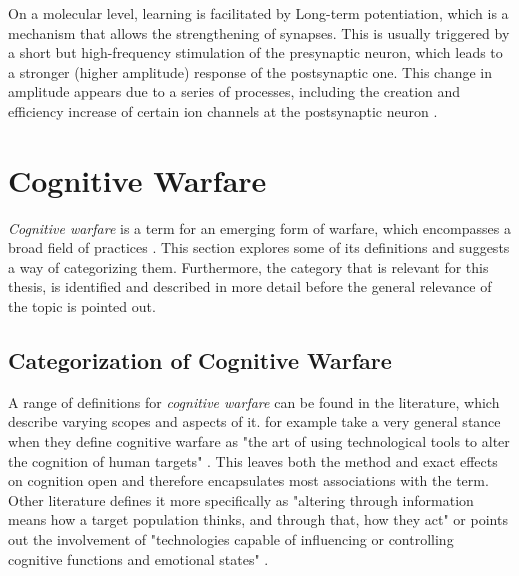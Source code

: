 
    On a molecular level, learning is facilitated by Long-term potentiation, which is a mechanism that allows the strengthening of synapses. This is usually triggered by a short but high-frequency stimulation of the presynaptic neuron, which leads to a stronger (higher amplitude) response of the postsynaptic one. This change in amplitude appears due to a series of processes, including the creation and efficiency increase of certain ion channels at the postsynaptic neuron \cite{thebrain-memory-molecular-a}.

    
\section{Cognitive Warfare}

    \textit{Cognitive warfare} is a term for an emerging form of warfare, which encompasses a broad field of practices \cite{Backes.2019} \cite{Claverie.2022} \cite{EADS.2023} \cite{MAKSYMENKO.2023} \cite{McCreight.2024} \cite{Miller.2023}. This section explores some of its definitions and suggests a way of categorizing them. Furthermore, the category that is relevant for this thesis, is identified and described in more detail before the general relevance of the topic is pointed out.


    \subsection{Categorization of Cognitive Warfare}

        A range of definitions for \textit{cognitive warfare} can be found in the literature, which describe varying scopes and aspects of it. \textcite{Claverie.2022} for example take a very general stance when they define cognitive warfare as "the art of using technological tools to alter the cognition of human targets" \cite{Claverie.2022}. This leaves both the method and exact effects on cognition open and therefore encapsulates most associations with the term.
        Other literature defines it more specifically as "altering through information means how a target population thinks, and through that, how they act" \cite{Backes.2019} or points out the involvement of "technologies capable of influencing or controlling cognitive functions and emotional states" \cite{EADS.2023}.
        
